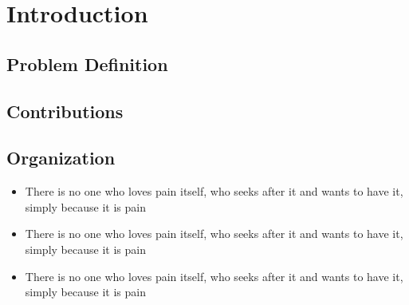 \chapter{Introduction}
\label{chp:b1}

\section{Problem Definition}

\section{Contributions}

\section{Organization}

\begin{itemize}
\item There is no one who loves pain itself, who seeks after it and wants to
    have it, simply because it is pain
\item There is no one who loves pain itself, who seeks after it and wants to
    have it, simply because it is pain
\item There is no one who loves pain itself, who seeks after it and wants to
    have it, simply because it is pain
\end{itemize}
